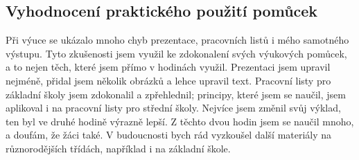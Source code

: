 \subsection{Vyhodnocení praktického použití pomůcek}
{Při výuce se ukázalo mnoho chyb prezentace, pracovních listů i mého samotného výstupu. Tyto zkušenosti jsem využil ke zdokonalení svých výukových pomůcek, a to nejen těch, které jsem přímo v hodinách využil.}\odst
{Prezentaci jsem upravil nejméně, přidal jsem několik obrázků a lehce upravil text. Pracovní listy pro základní školy jsem zdokonalil a zpřehlednil; principy, které jsem se naučil, jsem aplikoval i na pracovní listy pro střední školy. Nejvíce jsem změnil svůj výklad, ten byl ve druhé hodině výrazně lepší.}\odst
{Z těchto dvou hodin jsem se naučil mnoho, a doufám, že žáci také. V budoucnosti bych rád vyzkoušel další materiály na různorodějších třídách, například i na základní škole.}